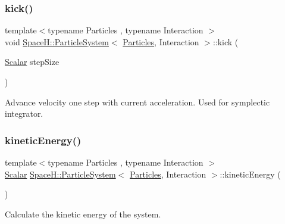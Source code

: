 \subsubsection{\texorpdfstring{kick()}{kick()}}
{\footnotesize\ttfamily template$<$typename Particles , typename Interaction $>$ \\
void \mbox{\hyperlink{class_space_h_1_1_particle_system}{Space\+H\+::\+Particle\+System}}$<$ \mbox{\hyperlink{struct_space_h_1_1_particles}{Particles}}, Interaction $>$\+::kick (\begin{DoxyParamCaption}\item[{\mbox{\hyperlink{class_space_h_1_1_particle_system_a522770dcfaf8b29aed35ea9348185a34}{Scalar}}}]{step\+Size }\end{DoxyParamCaption})\hspace{0.3cm}{\ttfamily [inline]}}



Advance velocity one step with current acceleration. Used for symplectic integrator. 

\mbox{\label{class_space_h_1_1_particle_system_acf2ffbad4476dae3f259a60338d80288}} 
\subsubsection{\texorpdfstring{kinetic\+Energy()}{kineticEnergy()}}
{\footnotesize\ttfamily template$<$typename Particles , typename Interaction $>$ \\
\mbox{\hyperlink{class_space_h_1_1_particle_system_a522770dcfaf8b29aed35ea9348185a34}{Scalar}} \mbox{\hyperlink{class_space_h_1_1_particle_system}{Space\+H\+::\+Particle\+System}}$<$ \mbox{\hyperlink{struct_space_h_1_1_particles}{Particles}}, Interaction $>$\+::kinetic\+Energy (\begin{DoxyParamCaption}{ }\end{DoxyParamCaption})\hspace{0.3cm}{\ttfamily [inline]}}



Calculate the kinetic energy of the system. 

